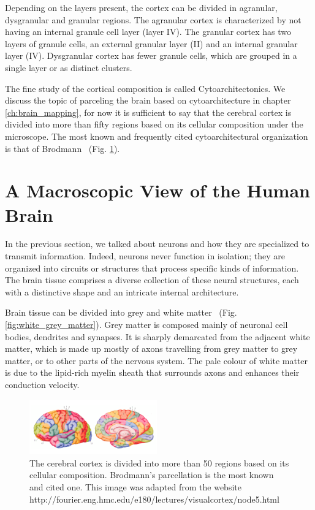 Depending on the layers present, the cortex can be divided in agranular,
dysgranular and granular regions\cite{Mesulam1982}. The agranular cortex is characterized by not
having an internal granule cell layer (layer IV). The granular cortex has two 
layers of granule cells, an external granular layer (II) and an internal granular
layer (IV). Dysgranular cortex has fewer granule cells, which are grouped in a
single layer or as distinct clusters.



The fine study of the cortical composition is called Cytoarchitectonics. We 
discuss the topic of parceling the brain based on cytoarchitecture in chapter
\ref{ch:brain_mapping}, for now it is sufficient to say that the cerebral cortex is divided into more than
fifty regions based on its cellular composition under the microscope. The most
known and frequently cited cytoarchitectural organization is that of
Brodmann~\cite{Brodmann1909} (Fig. \ref{fig:brodmann_small}).


\section{A Macroscopic View of the Human Brain}
In the previous section, we talked about neurons and how they are specialized
to transmit information. Indeed, neurons never function in isolation; they are
organized into circuits or structures that process specific kinds of information.
The brain tissue comprises a diverse collection of these neural structures,
each with a distinctive shape and an intricate internal architecture.

Brain tissue can be divided into grey and white matter~\cite{Johns} (Fig. \ref{fig:white_grey_matter}).
Grey matter is composed mainly of neuronal cell bodies, dendrites and synapses.
It is sharply demarcated from the adjacent white matter, which is made up mostly
of axons travelling from grey matter to grey matter, or to other parts of the
nervous system. The pale colour of white matter is due to the lipid-rich myelin
sheath that surrounds axons and enhances their conduction velocity\cite{Johns}.
\begin{figure}[t!]
    \includegraphics[width=0.49\textwidth]{2.neuroanatomy/img/brodmann.png}
    \caption{The cerebral cortex is divided into more than 50 regions based on
             its cellular composition. Brodmann's\cite{Brodmann1909}
             parcellation is the most known and cited one. This image was
             adapted from the website http://fourier.eng.hmc.edu/e180/lectures/visualcortex/node5.html}
    \label{fig:brodmann_small}
\end{figure}

